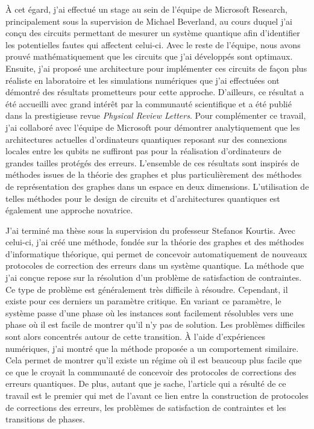 À cet égard, j'ai effectué un stage au sein de l'équipe de Microsoft Research,
principalement sous la supervision de Michael Beverland, au cours duquel j'ai conçu
des circuits permettant de mesurer un système quantique afin d'identifier les
potentielles fautes qui affectent celui-ci. 
Avec le reste de l'équipe, nous avons prouvé mathématiquement
que les circuits que j'ai développés sont optimaux.
Ensuite, j'ai proposé une architecture pour implémenter ces circuits
de façon plus réaliste en laboratoire
et les simulations numériques que j'ai effectuées ont démontré des résultats 
prometteurs pour cette approche. 
D'ailleurs, ce résultat a été accueilli avec grand intérêt par la communauté
scientifique et a été publié dans la prestigieuse revue \textit{Physical Review Letters}.
Pour complémenter ce travail,
j'ai collaboré avec l'équipe de Microsoft pour démontrer analytiquement 
que les architectures actuelles d'ordinateurs quantiques reposant sur des connexions
locales entre les qubits ne suffiront pas pour la réalisation d'ordinateurs de grandes
tailles protégés des erreurs.
L'ensemble de ces résultats sont inspirés de méthodes issues de la théorie des graphes
et plus particulièrement des méthodes de représentation des graphes dans un espace en 
deux dimensions.
L'utilisation de telles méthodes pour le design de circuits et d'architectures quantiques
est également une approche novatrice.

J'ai terminé ma thèse sous la supervision du professeur Stefanos Kourtis.
Avec celui-ci, j'ai créé une méthode, 
fondée sur la théorie des graphes et des méthodes d'informatique théorique,
qui permet de concevoir automatiquement de nouveaux protocoles de 
correction des erreurs dans un système quantique.
La méthode que j'ai conçue repose sur la résolution d'un problème 
de satisfaction de contraintes.
Ce type de problème est généralement très difficile à résoudre.
Cependant,
il existe pour ces derniers un paramètre critique. 
En variant ce paramètre, 
le système passe d'une phase où les instances sont facilement résolubles 
vers une phase où il est facile de montrer qu'il n'y pas de solution.
Les problèmes difficiles sont alors concentrés autour de cette transition.
À l'aide d'expériences numériques,
j'ai montré que la méthode proposée a un comportement similaire.
Cela permet de montrer qu'il existe un régime où il est beaucoup plus facile 
que ce que le croyait la communauté de concevoir des protocoles de corrections
des erreurs quantiques.
De plus,
autant que je sache,
l'article qui a résulté de ce travail est le premier qui met de l'avant
ce lien entre la construction de protocoles de corrections des erreurs,
les problèmes de satisfaction de contraintes et les transitions de phases.

